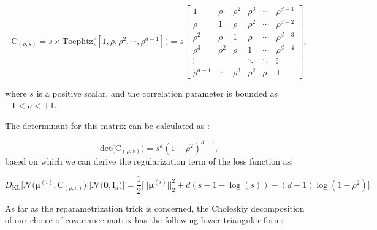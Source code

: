 \documentclass{article}
\begin{document}
\begin{equation}  \label{eq:rho_cov}
\mathrm{C}_{(\rho,s)} = s \times  \text{Toeplitz} \Big([1,\rho, \rho^2, \cdots, \rho^{d-1}] \Big)
= s \begin{bmatrix}
    1          & \rho        & \rho^2     & \rho^3       & \cdots   & \rho^{d-1} \\
    \rho       & 1           & \rho       & \rho^2       & \cdots   & \rho^{d-2} \\
    \rho^2     & \rho        & 1          & \rho         & \cdots   & \rho^{d-3} \\
    \rho^3     & \rho^2      & \rho       & 1            & \cdots   & \rho^{d-4} \\
    \vdots     &       &       & \ddots       & \ddots   & \vdots      \\
    \rho^{d-1} & \cdots  & \rho^3 & \rho^2   & \rho   & 1
  \end{bmatrix},
\end{equation}

where $s$ is a positive scalar, and the correlation parameter is bounded as $-1 < \rho  < +1$.

The determinant for this matrix can be calculated as \cite{10.2307/1993228}: 

\begin{equation} \label{eq:rho_det}
\text{det} \big( \mathrm{C}_{(\rho,s)} \big) = s^d (1 - \rho^2)^{d-1},
\end{equation}
based on which we can derive the regularization term of the loss function as:

\begin{equation} \label{eq:rho_KLD_loss}
D_{\text{KL}}\Big[ \mathcal{N} \Big( \boldsymbol{\mu}^{(i)}, \mathrm{C}_{(\rho,s)} \Big)    \Big|\Big|  \mathcal{N} \big( \mathbf{0}, \mathrm{I}_d \big)  \Big] = \frac{1}{2} \Big[
\big|\big| \boldsymbol{\mu}^{(i)} \big|\big|_2^2 + d(s-1-\log{(s)})  - (d-1)\log{(1 - \rho^2)}  
\Big].
\end{equation}


As far as the reparametrization trick is concerned, the Choleskiy decomposition of our choice of covariance matrix has the following lower triangular form:
\end{document}
